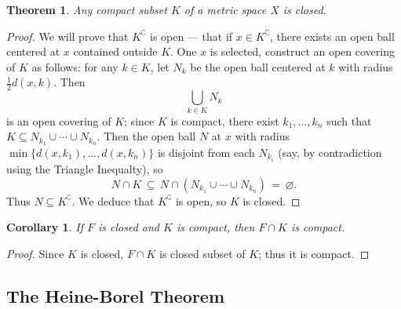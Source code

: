 \documentclass[11pt]{article}
\newtheorem{theorem}{Theorem}
\newtheorem{corollary}{Corollary}
\begin{document}
\newpage

\begin{theorem}
	Any compact subset $K$ of a metric space $X$ is closed.
\end{theorem}
\begin{adjustwidth}{1cm}{}
	\begin{proof} 
		We will prove that $K^{\complement}$ is open --- that if $x \in K^{\complement}$, there exists an open ball centered at $x$ contained outside $K$. One $x$ is selected, construct an open covering of $K$ as follows: for any $k \in K$, let $N_{k}$ be the open ball centered at $k$ with radius $\tfrac{1}{2} d(x, k)$. Then
		\[
			\bigcup_{k \in K} N_{k}
		\]
		is an open covering of $K$; since $K$ is compact, there exist $k_{1}, \ldots, k_{n}$ such that $K \subseteq N_{k_{1}} \cup \cdots \cup N_{k_{n}}$. Then the open ball $N$ at $x$ with radius $\min \{ d(x, k_{1}), \ldots, d(x, k_{n}) \}$ is disjoint from each $N_{k_{i}}$ (say, by contradiction using the Triangle Inequalty), so
		\[
			N \cap K \, \subseteq \, N \cap (N_{k_{1}} \cup \cdots \cup N_{k_{n}}) \, = \, \varnothing.
		\]
		Thus $N \subseteq K^{\complement}$. We deduce that $K^{\complement}$ is open, so $K$ is closed.
	\end{proof}
\end{adjustwidth}

\begin{corollary}
	If $F$ is closed and $K$ is compact, then $F \cap K$ is compact.
\end{corollary}
\begin{adjustwidth}{1cm}{}
	\begin{proof}
		Since $K$ is closed, $F \cap K$ is closed subset of $K$; thus it is compact.
	\end{proof}
\end{adjustwidth}

\subsection{The Heine-Borel Theorem}
\end{document}

